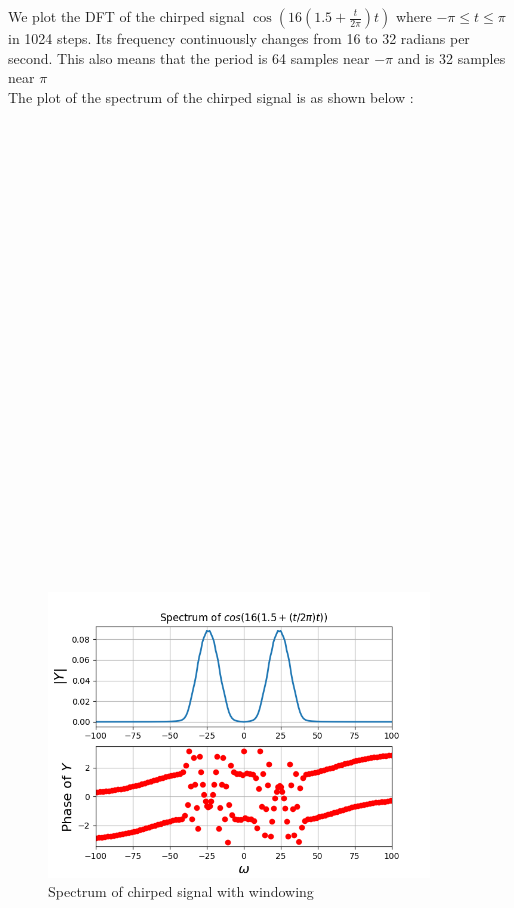\documentclass[10pt,a4paper]{article}
\begin{document}
We plot the DFT of the chirped signal $\cos(16(1.5 + \frac{t}{2\pi})t)$ where $-\pi \leq t \leq \pi$ in 1024 steps. Its frequency continuously changes from 16 to 32 radians per second. This also means that the period is 64 samples near $-\pi$ and is 32 samples near $\pi$\\

The plot of the spectrum of the chirped signal is as shown below :\\\\\\\\\\\\\\\\\\\\\\\\\\\\\\\\\\\\\\\\\\\\\\\\\\

\begin{figure}[!tbh]

\includegraphics[width = 0.9\textwidth]{5-spectrum of chirped function.png}
\caption{Spectrum of chirped signal with windowing}

\end{figure}
\end{document}
